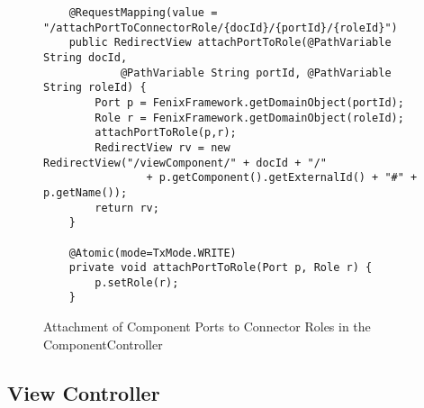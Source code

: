 \begin{figure}[h]
\lstset{style=customjava}
\begin{lstlisting}
	@RequestMapping(value = "/attachPortToConnectorRole/{docId}/{portId}/{roleId}")
	public RedirectView attachPortToRole(@PathVariable String docId,
			@PathVariable String portId, @PathVariable String roleId) {
		Port p = FenixFramework.getDomainObject(portId);
		Role r = FenixFramework.getDomainObject(roleId);
		attachPortToRole(p,r);
		RedirectView rv = new RedirectView("/viewComponent/" + docId + "/"
				+ p.getComponent().getExternalId() + "#" + p.getName());
		return rv;
	}
	
	@Atomic(mode=TxMode.WRITE)
	private void attachPortToRole(Port p, Role r) {
		p.setRole(r);
	}
\end{lstlisting}
\caption{Attachment of Component Ports to Connector Roles in the ComponentController}
\label{figure:ComponentControllerAttachment}
\end{figure}

\subsection{View Controller}
\label{substection:viewController}
